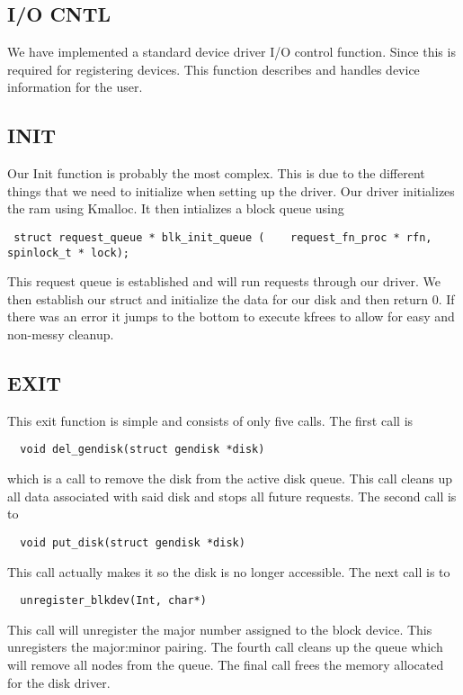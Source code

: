 \documentclass[onecolumn, draftclsnofoot,10pt, compsoc]{IEEEtran}
\begin{document}
	\subsection{I/O CNTL}
	We have implemented a standard device driver I/O control function. Since this is required for registering devices. This function describes and handles device information for the user.
    
	\subsection{INIT}
    Our Init function is probably the most complex. This is due to the different things that we need to initialize when setting up the driver. Our driver initializes the ram using Kmalloc. It then intializes a block queue using \begin{verbatim} struct request_queue * blk_init_queue (	request_fn_proc * rfn, spinlock_t * lock); \end{verbatim} This request queue is established and will run requests through our driver. We then establish our struct and initialize the data for our disk and then return 0. If there was an error it jumps to the bottom to execute kfrees to allow for easy and non-messy cleanup.
    
    \subsection{EXIT}
    
    This exit function is simple and consists of only five calls. The first call is \begin{verbatim}  void del_gendisk(struct gendisk *disk) \end{verbatim} which is a call to remove the disk from the active disk queue. This call cleans up all data associated with said disk and stops all future requests. The second call is to \begin{verbatim}  void put_disk(struct gendisk *disk) \end{verbatim} This call actually makes it so the disk is no longer accessible. The next call is to \begin{verbatim}  unregister_blkdev(Int, char*) \end{verbatim} This call will unregister the major number assigned to the block device. This unregisters the major:minor pairing. The fourth call cleans up the queue which will remove all nodes from the queue. The final call frees the memory allocated for the disk driver.
\end{document}
